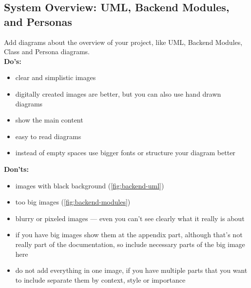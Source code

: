 \documentclass[12pt,a4paper]{article}
\begin{document}
\begin{spacing}{1.5}
    \subsection{System Overview: UML, Backend Modules, and Personas}
    Add diagrams about the overview of your project, like UML, Backend Modules,
    Class and Persona diagrams. \\ \textbf{Do's:}
    \begin{itemize}
        \item clear and simplistic images
        \item digitally created images are better, but you can also use hand drawn diagrams
        \item show the main content
        \item easy to read diagrams
        \item instead of empty spaces use bigger fonts or structure your diagram better
    \end{itemize}
    \textbf{Don'ts:}
    \begin{itemize}
        \item images with black background (\autoref{fig:backend-uml})
        \item too big images (\autoref{fig:backend-modules})
        \item blurry or pixeled images --- even you can't see clearly what it really is about
        \item if you have big images show them at the appendix part, although that's not
              really part of the documentation, so include necessary parts of the big image
              here
        \item do not add everything in one image, if you have multiple parts that you want to
              include separate them by context, style or importance
    \end{itemize}


\end{spacing}
\end{document}
